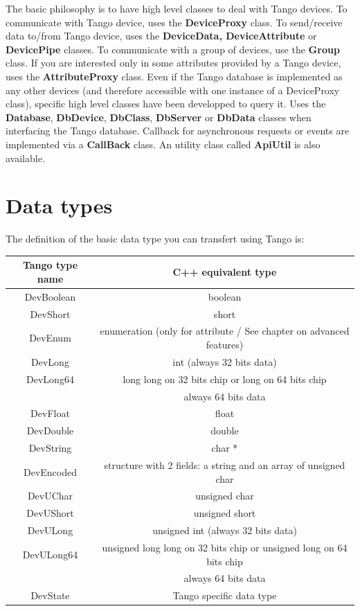 \noindent The basic philosophy is to have high level classes to deal
with Tango devices. To communicate with Tango device, uses the \textbf{DeviceProxy}
class. To send/receive data to/from Tango device, uses the \textbf{DeviceData,
DeviceAttribute} or \textbf{DevicePipe}
classes. To communicate with a group of devices, use the \textbf{Group}
class. If you are interested only in some attributes provided by a
Tango device, uses the \textbf{AttributeProxy}
class. Even if the Tango database is implemented as any other devices
(and therefore accessible with one instance of a DeviceProxy class),
specific high level classes have been developped to query it. Uses
the \textbf{Database}, \textbf{DbDevice},
\textbf{DbClass}, \textbf{DbServer}
or \textbf{DbData} classes when interfacing the Tango
database. Callback for asynchronous requests or events are implemented
via a \textbf{CallBack} class. An utility class called
\textbf{ApiUtil} is also available.

\section{Data types}

The definition of the basic data type you can transfert using Tango
is:

\vspace{0.3cm}

\begin{center}
\begin{longtable}{|c|c|}
\hline 
Tango type name & C++ equivalent type\tabularnewline
\hline 
\hline 
DevBoolean & boolean\tabularnewline
\hline 
DevShort & short\tabularnewline
\hline 
DevEnum & enumeration (only for attribute / See chapter on advanced features)\tabularnewline
\hline 
DevLong & int (always 32 bits data)\tabularnewline
\hline 
DevLong64 & long long on 32 bits chip or long on 64 bits chip\tabularnewline
 & always 64 bits data\tabularnewline
\hline 
DevFloat & float\tabularnewline
\hline 
DevDouble & double\tabularnewline
\hline 
DevString & char {*}\tabularnewline
\hline 
DevEncoded & structure with 2 fields: a string and an array of unsigned char\tabularnewline
\hline 
DevUChar & unsigned char\tabularnewline
\hline 
DevUShort & unsigned short\tabularnewline
\hline 
DevULong & unsigned int (always 32 bits data)\tabularnewline
\hline 
DevULong64 & unsigned long long on 32 bits chip or unsigned long on 64 bits chip\tabularnewline
 & always 64 bits data\tabularnewline
\hline 
DevState & Tango specific data type\tabularnewline
\hline 
\end{longtable}
\par\end{center}

